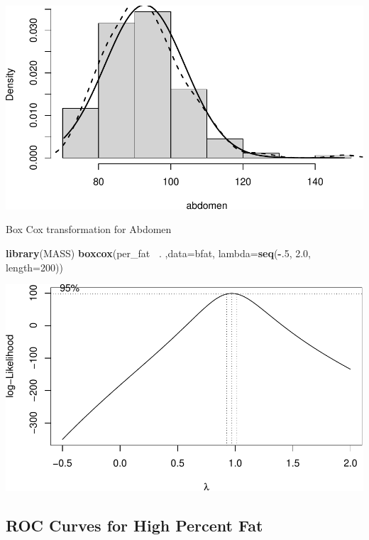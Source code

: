 \documentclass[]{article}
\newenvironment{Shaded}{\begin{snugshade}}{\end{snugshade}}
\newcommand{\KeywordTok}[1]{\textcolor[rgb]{0.13,0.29,0.53}{\textbf{#1}}}
\newcommand{\DataTypeTok}[1]{\textcolor[rgb]{0.13,0.29,0.53}{#1}}
\newcommand{\DecValTok}[1]{\textcolor[rgb]{0.00,0.00,0.81}{#1}}
\newcommand{\FloatTok}[1]{\textcolor[rgb]{0.00,0.00,0.81}{#1}}
\newcommand{\OperatorTok}[1]{\textcolor[rgb]{0.81,0.36,0.00}{\textbf{#1}}}
\newcommand{\NormalTok}[1]{#1}
\begin{document}
\includegraphics{BodyFat_files/figure-latex/unnamed-chunk-4-2.pdf}

Box Cox transformation for Abdomen

\begin{Shaded}
\begin{Highlighting}[]
\KeywordTok{library}\NormalTok{(MASS)}
\KeywordTok{boxcox}\NormalTok{(per_fat }\OperatorTok{~}\NormalTok{. ,}\DataTypeTok{data=}\NormalTok{bfat, }\DataTypeTok{lambda=}\KeywordTok{seq}\NormalTok{(}\OperatorTok{-}\NormalTok{.}\DecValTok{5}\NormalTok{, }\FloatTok{2.0}\NormalTok{, }\DataTypeTok{length=}\DecValTok{200}\NormalTok{))}
\end{Highlighting}
\end{Shaded}

\includegraphics{BodyFat_files/figure-latex/unnamed-chunk-5-1.pdf}

\subsection{ROC Curves for High Percent
Fat}\label{roc-curves-for-high-percent-fat}
\end{document}
